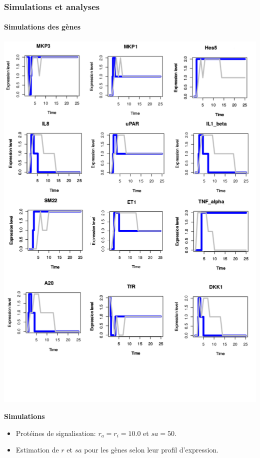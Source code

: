 \begin{frame}[c]
  \frametitle{Simulations et analyses}
  \framesubtitle{Simulations des gènes}
  
 \begin{center}
  \includegraphics[scale=0.15]{figs/12genes_sim.png}
\end{center}

\textbf{Simulations}

\begin{itemize}
  \item Protéines de signalisation:  $r_{a} = r_{i}=10.0$ et $sa = 50 $.
  \item Estimation de  $r$ et $sa$ pour les gènes selon leur profil d'expression. 
  
\end{itemize}


\end{frame}




